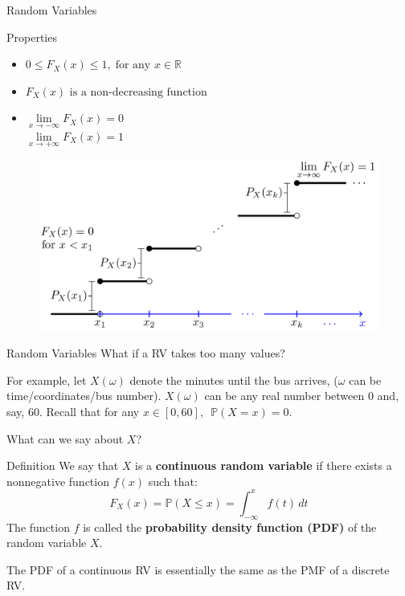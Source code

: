 \documentclass{beamer}
\newcommand{\PP}{\mathbb{P}}
\begin{document}
\begin{frame}{Random Variables}


\begin{block}{Properties}
\begin{itemize}[<+->]
    \item $0 \leq F_X(x) \leq 1, \; \text{for any } x \in \mathbb{R}$
\item $F_X(x) \text{ is a non-decreasing function}$
\item $\lim\limits_{x\to-\infty} F_X(x) = 0$\\
$\lim\limits_{x\to+\infty} F_X(x) = 1 $

\end{itemize}

\end{block}

\pause 

\begin{figure}
    \centering
    \includegraphics[width=0.7\linewidth]{cdf_typical.png}
\end{figure}
\end{frame}


\begin{frame}{Random Variables}
    What if a RV takes too many values?\pause

    For example, let $X(\omega)$ denote the minutes until the bus arrives, ($\omega$ can be time/coordinates/bus number). \pause $X(\omega)$ can be any real number between $0$ and, say, $60$. Recall that for any $x\in[0,60],\,$ $\PP(X=x)=0$.
    
    \pause What can we say about $X$?\pause

\begin{block}{Definition}
    We say that \( X \) is a \textbf{continuous random variable} if there exists a nonnegative function \( f(x) \) such that:
\[ F_X(x) = \PP(X \leq x) = \int_{-\infty}^{x} f(t) \, dt \]
\pause The function \( f \) is called the \textbf{probability density function (PDF)} of the random variable \( X \).

\end{block}\pause
The PDF of a continuous RV is essentially the same as the PMF of a discrete RV.

\end{frame}
\end{document}
